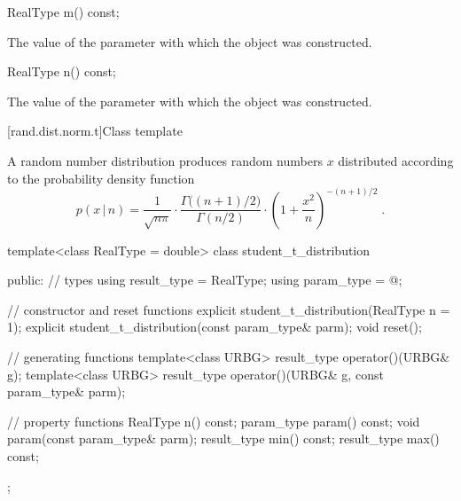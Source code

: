 %
\begin{itemdecl}
RealType m() const;
\end{itemdecl}

\begin{itemdescr}
\pnum\returns The value of the  parameter
 with which the object was constructed.
\end{itemdescr}

%
\begin{itemdecl}
RealType n() const;
\end{itemdecl}

\begin{itemdescr}
\pnum\returns The value of the  parameter
 with which the object was constructed.
\end{itemdescr}


[rand.dist.norm.t]{Class template }%
%
%

\pnum
A  random number distribution
produces random numbers $x$
distributed according to
the probability density function%
%
%
\[%
 p(x\,|\,n)
      =  \frac{1}
              {\sqrt{n \pi}}
         \cdot \frac{\Gamma\big((n+1)/2\big)}
                    {\Gamma(n/2)}
         \cdot \left( 1+\frac{x^2}{n} \right) ^ {-(n+1)/2}
\; \mbox{.}
\]

%
\begin{codeblock}
template<class RealType = double>
  class student_t_distribution {
  public:
    // types
    using result_type = RealType;
    using param_type  = @\unspec@;

    // constructor and reset functions
    explicit student_t_distribution(RealType n = 1);
    explicit student_t_distribution(const param_type& parm);
    void reset();

    // generating functions
    template<class URBG>
      result_type operator()(URBG& g);
    template<class URBG>
      result_type operator()(URBG& g, const param_type& parm);

    // property functions
    RealType n() const;
    param_type param() const;
    void param(const param_type& parm);
    result_type min() const;
    result_type max() const;
  };
\end{codeblock}



